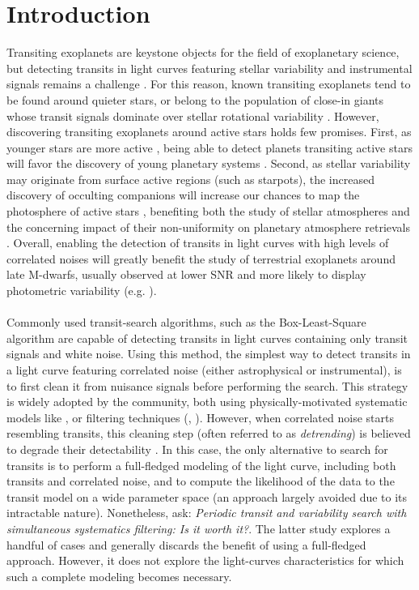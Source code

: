 \documentclass[modern]{aastex631}
\begin{document}
\section*{Introduction}
Transiting exoplanets are keystone objects for the field of exoplanetary science, but detecting transits in light curves featuring stellar variability and instrumental signals remains a challenge \citep{Pont2006,Howell2016}. For this reason, known transiting exoplanets tend to be found around quieter stars, or belong to the population of close-in giants whose transit signals dominate over stellar rotational variability \citep{Simpson2023}. However, discovering transiting exoplanets around active stars holds few promises. First, as younger stars are more active \citep{Skumanich1972}, being able to detect planets transiting active stars will favor the discovery of young planetary systems \citep[e.g.][]{Newton2022}. Second, as stellar variability may originate from surface active regions (such as starpots), the increased discovery of occulting companions will increase our chances to map the photosphere of active stars \citep[e.g.][]{Morris2017}, benefiting both the study of stellar atmospheres and the concerning impact of their non-uniformity on planetary atmosphere retrievals \citep{rackham2018}. Overall, enabling the detection of transits in light curves with high levels of correlated noises will greatly benefit the study of terrestrial exoplanets around late M-dwarfs, usually observed at lower SNR and more likely to display photometric variability (e.g. \citealt{Murray2020}).
\\\\
Commonly used transit-search algorithms, such as the Box-Least-Square algorithm \citep[BLS,][]{bls} are capable of detecting transits in light curves containing only transit signals and white noise. Using this method, the simplest way to detect transits in a light curve featuring correlated noise (either astrophysical or instrumental), is to first clean it from nuisance signals before performing the search. This strategy is widely adopted by the community, both using physically-motivated systematic models like \cite{everest1, everest2}, or filtering techniques (\citealt{Jenkins2010}, \citealt{wotan}). However, when correlated noise starts resembling transits, this cleaning step (often referred to as \textit{detrending}) is believed to degrade their detectability \cite[see subsection 4.3 of][]{wotan}. In this case, the only alternative to search for transits is to perform a full-fledged modeling of the light curve, including both transits and correlated noise, and to compute the likelihood of the data to the transit model on a wide parameter space (an approach largely avoided due to its intractable nature). Nonetheless, \cite{kovacs2016} ask: \textit{Periodic transit and variability search with simultaneous systematics filtering: Is it worth it?}. The latter study explores a handful of cases and generally discards the benefit of using a full-fledged approach. However, it does not explore the light-curves characteristics for which such a complete modeling becomes necessary.\\\\
\end{document}
